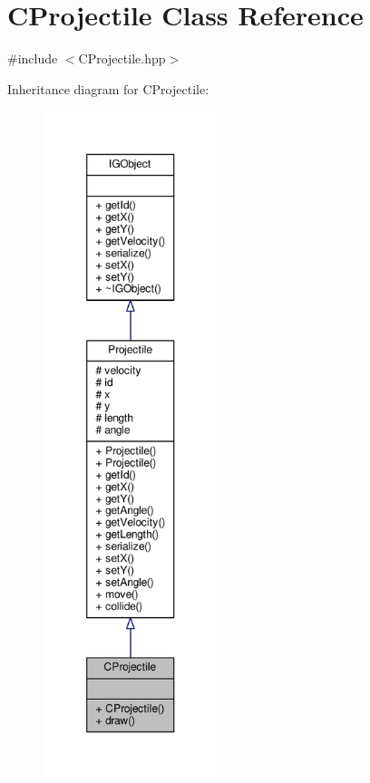 \hypertarget{class_c_projectile}{}\section{C\+Projectile Class Reference}
\label{class_c_projectile}


{\ttfamily \#include $<$C\+Projectile.\+hpp$>$}



Inheritance diagram for C\+Projectile\+:\nopagebreak
\begin{figure}[H]
\begin{center}
\leavevmode
\includegraphics[height=550pt]{class_c_projectile__inherit__graph}
\end{center}
\end{figure}


